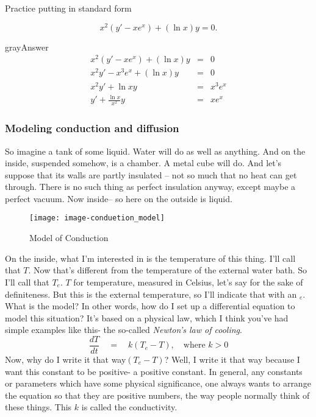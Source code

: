 \begin{problem}
  Practice putting in standard form
\end{problem}
\begin{equation*}
  x^2 (y' -x e^x) + (\ln x) y = 0. 
\end{equation*}
\begin{mybox}{gray}{Answer}
  \begin{eqnarray*}
    x^2 (y' -x e^x) + (\ln x) y &=& 0 \\
    x^2y' - x^3 e^x + (\ln x) y &=& 0 \\ 
    x^2y' +  \ln x y &=& x^3 e^x \\
    y' +  \frac{\ln x}{x^2} y &=& x e^x
  \end{eqnarray*}
\end{mybox}
\clearpage

\subsubsection{Modeling conduction and diffusion}

So imagine a tank of some liquid. Water will do as well as anything.
And on the inside, suspended somehow, is a chamber.
A metal cube will do. And let's suppose that its walls are partly insulated
-- not so much that no heat can get through.
There is no such thing as perfect insulation anyway, except maybe a perfect vacuum.
Now inside-- so here on the outside is liquid.
\begin{figure}[ht!]
  \centering
  \texttt{[image: image-conduetion\_model]}
  \caption{Model of Conduction}
\end{figure}

On the inside, what I'm interested in is the temperature of this thing.
I'll call that $T$.
Now that's different from the temperature of the external water bath.
So I'll call that $T_e$. $T$ for temperature, measured in Celsius, let's say for the sake of definiteness.
But this is the external temperature, so I'll indicate that with an $_e$.\\

What is the model? In other words, how do I set up a differential equation to model this situation?
It's based on a physical law, which I think you've had simple examples
like this- the so-called \textit{Newton's law of cooling}.
\begin{equation*}
  \frac{dT}{dt} \quad = \quad k (T_e - T), \quad \text{where } k > 0 
\end{equation*}
Now, why do I write it that way$(T_e - T)$?
Well, I write it that way because I want this constant to be {\color{orange} positive- a positive constant}.
In general, any constants or parameters which have some physical significance, one always
wants to arrange the equation so that they are positive numbers, the way people normally think of these things.
This $k$ is called the conductivity.\\

